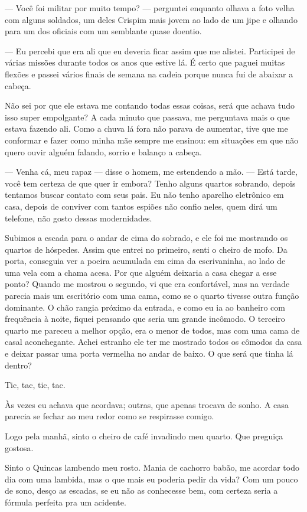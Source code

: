 — Você foi militar por muito tempo? — perguntei enquanto olhava a foto velha com alguns soldados, um deles Crispim mais jovem ao lado de um jipe e olhando para um dos oficiais com um semblante quase doentio.

— Eu percebi que era ali que eu deveria ficar assim que me alistei. Participei de várias missões durante todos os anos que estive lá. É certo que paguei muitas flexões e passei vários finais de semana na cadeia porque nunca fui de abaixar a cabeça.

Não sei por que ele estava me contando todas essas coisas, será que achava tudo isso super empolgante? A cada minuto que passava, me perguntava mais o que estava fazendo ali. Como a chuva lá fora não parava de aumentar, tive que me conformar e fazer como minha mãe sempre me ensinou: em situações em que não quero ouvir alguém falando, sorrio e balanço a cabeça.

— Venha cá, meu rapaz — disse o homem, me estendendo a mão. — Está tarde, você tem certeza de que quer ir embora? Tenho alguns quartos sobrando, depois tentamos buscar contato com seus pais. Eu não tenho aparelho eletrônico em casa, depois de conviver com tantos espiões não confio neles, quem dirá um telefone, não gosto dessas modernidades.

Subimos a escada para o andar de cima do sobrado, e ele foi me mostrando os quartos de hóspedes. Assim que entrei no primeiro, senti o cheiro de mofo. Da porta, conseguia ver a poeira acumulada em cima da escrivaninha, ao lado de uma vela com a chama acesa. Por que alguém deixaria a casa chegar a esse ponto? Quando me mostrou o segundo, vi que era confortável, mas na verdade parecia mais um escritório com uma cama, como se o quarto tivesse outra função dominante. O chão rangia próximo da entrada, e como eu ia ao banheiro com frequência à noite, fiquei pensando que seria um grande incômodo. O terceiro quarto me pareceu a melhor opção, era o menor de todos, mas com uma cama de casal aconchegante. Achei estranho ele ter me mostrado todos os cômodos da casa e deixar passar uma porta vermelha no andar de baixo. O que será que tinha lá dentro?

Tic, tac, tic, tac.

Às vezes eu achava que acordava; outras, que apenas trocava de sonho. A casa parecia se fechar ao meu redor como se respirasse comigo.

Logo pela manhã, sinto o cheiro de café invadindo meu quarto. Que preguiça gostosa.

Sinto o Quincas lambendo meu rosto. Mania de cachorro babão, me acordar todo dia com uma lambida, mas o que mais eu poderia pedir da vida? Com um pouco de sono, desço as escadas, se eu não as conhecesse bem, com certeza seria a fórmula perfeita pra um acidente.

